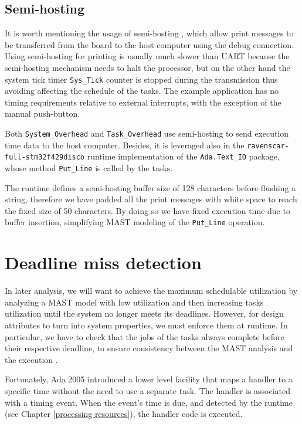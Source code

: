\documentclass{article}
\begin{document}
\subsection{Semi-hosting}

It is worth mentioning the usage of semi-hosting \cite{semihosting}, which allow print messages to be transferred from the board to the host computer using the debug connection. Using semi-hosting for printing is usually much slower than UART because the semi-hosting mechanism needs to halt the processor, but on the other hand the system tick timer \texttt{Sys\_Tick} counter is stopped during the transmission thus avoiding affecting the schedule of the tasks. The example application has no timing requirements relative to external interrupts, with the exception of the manual push-button.

Both \texttt{System\_Overhead} and \texttt{Task\_Overhead} use semi-hosting to send execution time data to the host computer. Besides, it is leveraged also in the \texttt{ravenscar-full-stm32f429disco} runtime implementation of the \texttt{Ada.Text\_IO} package, whose method \texttt{Put\_Line} is called by the tasks.

The runtime defines a semi-hosting buffer size of 128 characters before flushing a string, therefore we have padded all the print messages with white space to reach the fixed size of 50 characters. By doing so we have fixed execution time due to buffer insertion, simplifying MAST modeling of the \texttt{Put\_Line} operation.

\section{Deadline miss detection}

In later analysis, we will want to achieve the maximum schedulable utilization by analyzing a MAST model with low utilization and then increasing tasks utilization until the system no longer meets its deadlines. However, for design attributes to turn into system properties, we must enforce them at runtime. In particular, we have to check that the jobs of the tasks always complete before their respective deadline, to ensure consistency between the MAST analysis and the execution \cite{timing-properties}.

Fortunately, Ada 2005 introduced a lower level facility that maps a handler to a specific time without the need to use a separate task. The handler is associated with a timing event. When the event's time is due, and detected by the runtime (see Chapter \ref{processing-resources}), the handler code is executed.
\end{document}
